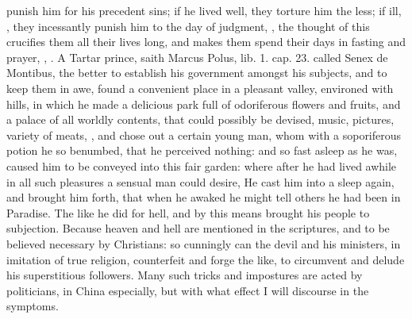 {punish him for his precedent sins; if he lived well, they torture him
the less; if ill, , they
incessantly punish him to the day of judgment, , the thought of this
crucifies them all their lives long, and makes them spend their days in
fasting and prayer, , \etc{}. A Tartar prince, saith
Marcus Polus, \textlatin{lib. 1. cap. 23.} called \textlatin{Senex de Montibus}, the better to
establish his government amongst his subjects, and to keep them in awe,
found a convenient place in a pleasant valley, environed with hills, in
which he made a delicious park full of odoriferous flowers and
fruits, and a palace of all worldly contents, that could possibly be
devised, music, pictures, variety of meats, \etc{}, and chose out a
certain young man, whom with a soporiferous potion he so
benumbed, that he perceived nothing: and so fast asleep as he was,
caused him to be conveyed into this fair garden: where after he had
lived awhile in all such pleasures a sensual man could desire, He
cast him into a sleep again, and brought him forth, that when he awaked
he might tell others he had been in Paradise. The like he did for hell,
and by this means brought his people to subjection. Because heaven and
hell are mentioned in the scriptures, and to be believed necessary by
Christians: so cunningly can the devil and his ministers, in imitation
of true religion, counterfeit and forge the like, to circumvent and
delude his superstitious followers. Many such tricks and impostures are
acted by politicians, in China especially, but with what effect I will
discourse in the symptoms.

}
